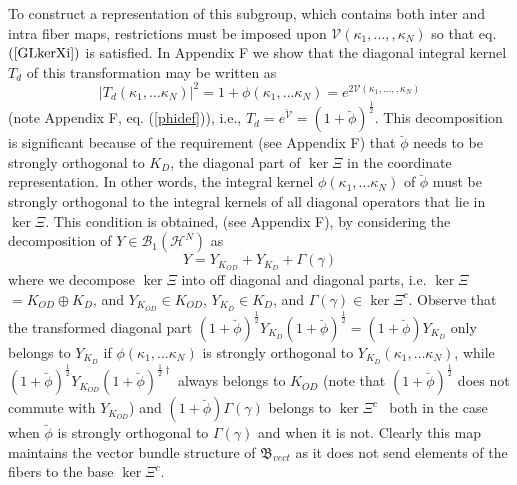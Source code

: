 \documentclass[aps,preprint]{revtex4}%
\begin{document}
To construct a representation of this subgroup, which contains both inter and
intra fiber maps, restrictions must be imposed upon $\mathcal{V}(\kappa
_{1},\ldots,,\kappa_{N})$ so that eq. $\left(  \ref{GLkerXi}\right)  $ is
satisfied. In Appendix F we show that the diagonal integral kernel $T_{d}$ of
this transformation may be written as
\begin{equation}
|T_{d}(\kappa_{1},\ldots\kappa_{N})|^{2}=1+\phi(\kappa_{1},\ldots\kappa
_{N})=e^{2\mathcal{V}(\kappa_{1},\ldots,,\kappa_{N})}%
\end{equation}
(note Appendix F, eq. (\ref{phidef})), i.e., $T_{d}=e^{\breve{\mathcal{V}}%
}=\left(  1+\breve{\phi}\right)  ^{\frac{1}{2}}$. This decomposition is
significant because of the requirement (see Appendix F) that $\breve{\phi}$
needs to be strongly orthogonal to $K_{D}$, the diagonal part of $\ker\Xi$ in
the coordinate representation. In other words, the integral kernel
$\phi(\kappa_{1},\ldots\kappa_{N})$ of $\breve{\phi}$ must be strongly
orthogonal to the integral kernels of all diagonal operators that lie in
$\ker\Xi$. This condition is obtained, (see Appendix F), by considering the
decomposition of $Y\in\mathcal{B}_{1}(\mathcal{H}^{N})$ as
\begin{equation}
Y=Y_{K_{OD}}+Y_{K_{D}}+\Gamma\left(  \gamma\right)
\end{equation}
where we decompose $\ker\Xi$ into off diagonal and diagonal parts, i.e.
$\ker\Xi$ $=K_{OD}\oplus K_{D}$, and $Y_{K_{OD}}\in K_{OD}$, $Y_{K_{D}}\in
K_{D}$, and $\Gamma\left(  \gamma\right)  \in\ker\Xi^{c}$. Observe that the
transformed diagonal part $\left(  1+\breve{\phi}\right)  ^{\frac{1}{2}%
}Y_{K_{D}}\left(  1+\breve{\phi}\right)  ^{\frac{1}{2}}=\left(  1+\breve{\phi
}\right)  Y_{K_{D}}$ only belongs to $Y_{K_{D}}$ if $\phi\left(  \kappa
_{1},\ldots\kappa_{N}\right)  $ is strongly orthogonal to $Y_{K_{D}}\left(
\kappa_{1},\ldots\kappa_{N}\right)  $, while $\left(  1+\breve{\phi}\right)
^{\frac{1}{2}}Y_{K_{OD}}\left(  1+\breve{\phi}\right)  ^{\frac{1}{2}\dagger}$
always belongs to $K_{OD}$ (note that $\left(  1+\breve{\phi}\right)
^{\frac{1}{2}}$ does not commute with $Y_{K_{OD}}$) and $\left(  1+\breve
{\phi}\right)  \Gamma\left(  \gamma\right)  $ belongs to $\ker\Xi^{c\text{ }}$
both in the case when $\breve{\phi}$ is strongly orthogonal to $\Gamma\left(
\gamma\right)  $ and when it is not. Clearly this map maintains the vector
bundle structure of $\mathfrak{B}_{vect}$ as it does not send elements of the
fibers to the base $\ker\Xi^{c}$.
\end{document}
